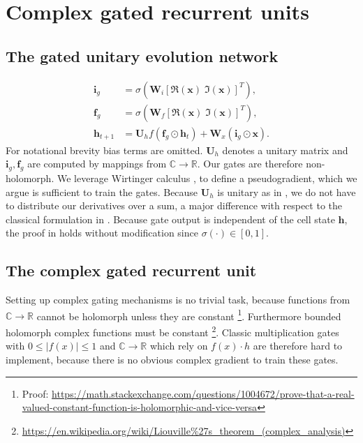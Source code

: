 \documentclass{article}
\begin{document}
\section{Complex gated recurrent units}

\subsection{The gated unitary evolution network}
\begin{align}
\mathbf{i}_g &= \sigma(\mathbf{W}_i[\Re(\mathbf{x}) \; \Im(\mathbf{x})]^T),  \\
\mathbf{f}_g &= \sigma(\mathbf{W}_f[\Re(\mathbf{x}) \; \Im(\mathbf{x})]^T),  \\
\mathbf{h}_{t+1} &= \mathbf{U}_h f(\mathbf{f}_g \odot \mathbf{h}_t) + \mathbf{W}_x(\mathbf{i}_g \odot \mathbf{x}).
\end{align}
For notational brevity bias terms are omitted. $\mathbf{U}_h$ denotes a unitary matrix and $\mathbf{i}_g, \mathbf{f}_g$ are computed by mappings from $\mathbb{C} \rightarrow \mathbb{R}$. Our gates are therefore non-holomorph. We leverage Wirtinger calculus \cite{Franken}\cite{Delgado}\cite{Wirtinger}, to define a pseudogradient, which we argue is sufficient to train the gates. Because $\mathbf{U}_h$ is unitary as in \cite{Arjovsky}, we do not have to distribute our derivatives over a sum, a major difference with respect to the classical formulation in \cite{Hochreiter}. Because gate output is independent of the cell state $\mathbf{h}$, the proof in \cite{Arjovsky} holds without modification since $\sigma(\cdot) \in [0, 1]$.

\subsection{The complex gated recurrent unit}
Setting up complex gating mechanisms is no trivial task, because functions from $\mathbb{C} \rightarrow \mathbb{R}$ cannot be holomorph unless they are constant \cite[page 9]{Bornemann}\footnote{Proof: \url{https://math.stackexchange.com/questions/1004672/prove-that-a-real-valued-constant-function-is-holomorphic-and-vice-versa}}. Furthermore bounded holomorph complex functions must be constant \cite[page 38]{Bornemann}\footnote{\url{https://en.wikipedia.org/wiki/Liouville\%27s\_theorem\_(complex\_analysis)}}.
Classic multiplication gates with $0 \leq |f(x)| \leq 1$ and $\mathbb{C} \rightarrow \mathbb{R}$ which rely on $f(x) \cdot h$ are therefore hard to implement, because there is no obvious complex gradient to train these gates. 
\end{document}
